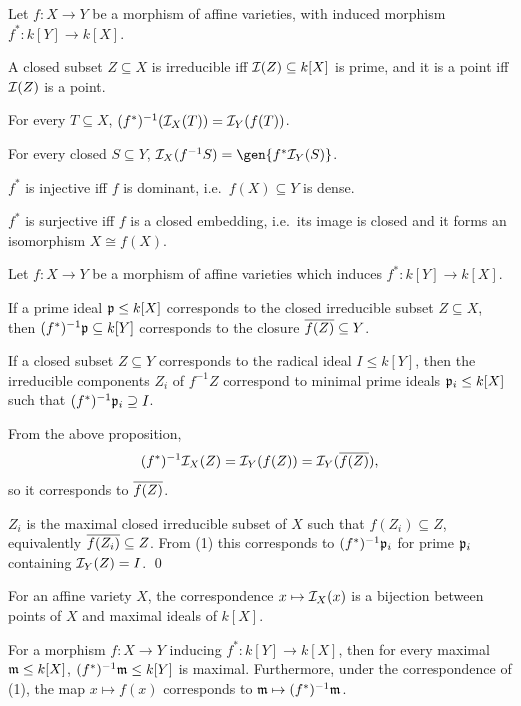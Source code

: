\bprop

    Let $f\colon X\to Y$ be a morphism of affine varieties, with induced morphism $f^*\colon k[Y]\to k[X]$.
    \benum
        \item A closed subset $Z\subseteq X$ is irreducible iff ${{\cal I}}(Z)\subseteq k[X]$ is prime, and it is a point iff ${{\cal I}}(Z)$ is a point.
        \item For every $T\subseteq X$, $(f^*)^{-1}({{\cal I}}_X(T))={{\cal I}}_Y(f(T))$.
        \item For every closed $S\subseteq Y$, $\I_X(f^{-1}S)=\gen{f^*\I_Y(S)}$.
        \item $f^*$ is injective iff $f$ is {\emphcolor dominant}, i.e.\ $f(X)\subseteq Y$ is dense.
        \item $f^*$ is surjective iff $f$ is a closed embedding, i.e.\ its image is closed and it forms an isomorphism $X\cong f(X)$.
    \eenum

\eprop

\bcoro

    Let $f\colon X\to Y$ be a morphism of affine varieties which induces $f^*\colon k[Y]\to k[X]$.
    \benum
        \item If a prime ideal ${{\frak p}}\leq k[X]$ corresponds to the closed irreducible subset $Z\subseteq X$, then $(f^*)^{-1}{{\frak p}}\subseteq k[Y]$ corresponds to the
        closure ${\overline{f(Z)}}\subseteq Y$.
        \item If a closed subset $Z\subseteq Y$ corresponds to the radical ideal $I\leq k[Y]$, then the irreducible components $Z_i$ of $f^{-1}Z$ correspond
        to minimal prime ideals ${{\frak p}}_i\leq k[X]$ such that $(f^*)^{-1}{{\frak p}}_i\supseteq I$.
    \eenum

\ecoro

\bproof

    \benum
        \item From the above proposition,
        $$ (f^*)^{-1}{{\cal I}}_X(Z) = {{\cal I}}_Y(f(Z)) = {{\cal I}}_Y({\overline{f(Z)}}) , $$
        so it corresponds to ${\overline{f(Z)}}$.
        \item $Z_i$ is the maximal closed irreducible subset of $X$ such that $f(Z_i)\subseteq Z$, equivalently ${\overline{f(Z_i)}}\subseteq Z$.
        From (1) this corresponds to $(f^*)^{-1}{{\frak p}}_i$ for prime ${{\frak p}}_i$ containing ${{\cal I}}_Y(Z)=I$.
        \qed
    \eenum

\eproof

\bcoro

    \benum
        \item For an affine variety $X$, the correspondence $x\mapsto{{\cal I}}_X(x)$ is a bijection between points of $X$ and maximal ideals of $k[X]$.
        \item For a morphism $f\colon X\to Y$ inducing $f^*\colon k[Y]\to k[X]$, then for every maximal ${{\frak m}}\leq k[X]$, $(f^*)^{-1}{{\frak m}}\leq k[Y]$
        is maximal.
        Furthermore, under the correspondence of (1), the map $x\mapsto f(x)$ corresponds to ${{\frak m}}\mapsto(f^*)^{-1}{{\frak m}}$.
    \eenum

